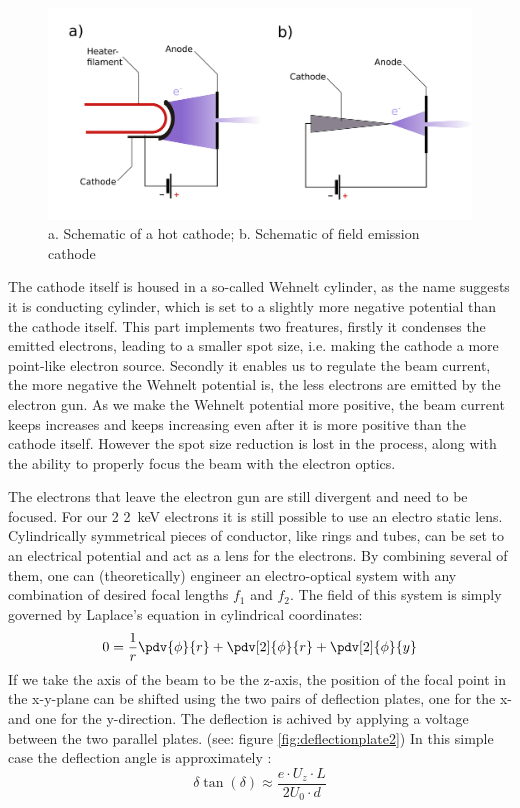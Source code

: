 \begin{figure}
	\centering
	\includegraphics[width=0.9\linewidth]{Chapters/CRT-Basics/HotCathodeColdCathode}
	\caption{a. Schematic of a hot cathode; b. Schematic of field emission cathode}
	\label{fig:hotcathodecoldcathode}
\end{figure}

The cathode itself is housed in a so-called Wehnelt cylinder, as the name suggests it is conducting cylinder, which is set to a slightly more negative potential than the cathode itself. This part implements two freatures, firstly it condenses the emitted electrons, leading to a smaller spot size, i.e. making the cathode a more point-like electron source. Secondly it enables us to regulate the beam current, the more negative the Wehnelt potential is, the less electrons are emitted by the electron gun. As we make the Wehnelt potential more positive, the beam current keeps increases and keeps increasing even after it is more positive than the cathode itself. However the spot size reduction is lost in the process, along with the ability to properly focus the beam with the electron optics.

The electrons that leave the electron gun are still divergent and need to be focused. For our 2 \SI{2}{\kilo\electronvolt} electrons it is still possible to use an electro static lens. Cylindrically symmetrical pieces of conductor, like rings and tubes, can be set to an electrical potential and act as a lens for the electrons. By combining several of them, one can (theoretically) engineer an electro-optical system with any combination of desired focal lengths $f_1$ and $f_2$. The field of this system is simply governed by Laplace's equation in cylindrical coordinates:
\begin{equation}
	0=\dfrac{1}{r}\pdv{\phi}{r}+\pdv[2]{\phi}{r}+\pdv[2]{\phi}{y}
\end{equation}
If we take the axis of the beam to be the z-axis, the position of the focal point in the x-y-plane can be shifted using the two pairs of deflection plates, one for the x- and one for the y-direction. The deflection is achived by applying a voltage between the two parallel plates. (see: figure \ref{fig:deflectionplate2}) In this simple case the deflection angle is approximately \cite{Demtroeder3}:
\begin{equation}\label{key}
\delta \tan(\delta) \approx \frac{e \cdot U_z\cdot L}{2 U_0 \cdot d}
\end{equation}

